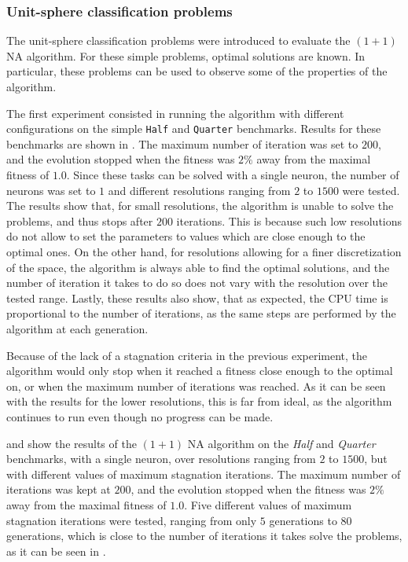 \subsubsection{Unit-sphere classification problems}

The unit-sphere classification problems \cite{na} were introduced to evaluate the $(1 + 1)$ NA algorithm. For these simple problems, optimal solutions are known. In particular, these
problems can be used to observe some of the properties of the algorithm.

The first experiment consisted in running the algorithm with different configurations on the simple \texttt{Half} and \texttt{Quarter} benchmarks.
Results for these benchmarks are shown in . The maximum number of iteration was set to $200$, and the evolution stopped when the fitness
was $2\%$ away from the maximal fitness of $1.0$. Since these tasks can be solved with a single neuron, the number of neurons was set to $1$ and different resolutions ranging
from $2$ to $1500$ were tested. The results show that, for small resolutions, the algorithm is unable to solve the problems, and thus stops after $200$ iterations. This is
because such low resolutions do not allow to set the parameters to values which are close enough to the optimal ones. On the other hand,
for resolutions allowing for a finer discretization of the space, the algorithm is always able to find the optimal solutions, and the number of iteration it takes to do so
does not vary with the resolution over the tested range. Lastly, these results also show, that as expected, the CPU time is proportional to the number of iterations,
as the same steps are performed by the algorithm at each generation.

Because of the lack of a stagnation criteria in the previous experiment, the algorithm would only stop when it reached a fitness close enough to the optimal on, or when
the maximum number of iterations was reached. As it can be seen with the results for the lower resolutions, this is far from ideal, as the algorithm continues to run even
though no progress can be made.

 and  show the results of the $(1 + 1)$ NA algorithm on the \textit{Half} and \textit{Quarter} benchmarks, with a single neuron, over
resolutions ranging from $2$ to $1500$, but with different values of maximum stagnation iterations. The maximum number of iterations was kept at $200$, and the evolution stopped when the fitness
was $2\%$ away from the maximal fitness of $1.0$. Five different values of maximum stagnation iterations were tested, ranging from only $5$ generations to $80$ generations, which is close to
the number of iterations it takes solve the problems, as it can be seen in .

